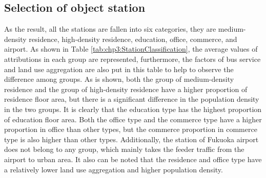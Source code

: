 \subsection{Selection of object station}
%
As the result, all the stations are fallen into six categories, they are medium-density residence, high-density residence, education, office, commerce, and airport. As shown in Table \ref{tab:chp3:StationClassification}, the average values of attributions in each group are represented, furthermore, the factors of bus service and land use aggregation are also put in this table to help to observe the difference among groups. As is shown, both the group of medium-density residence and the group of high-density residence have a higher proportion of residence floor area, but there is a significant difference in the population density in the two groups. It is clearly that the education type has the highest proportion of education floor area. Both the office type and the commerce type have a higher proportion in office than other types, but the commerce proportion in commerce type is also higher than other types. Additionally, the station of Fukuoka airport does not belong to any group, which mainly takes the feeder traffic from the airport to urban area. It also can be noted that the residence and office type have a relatively lower land use aggregation and higher population density.

